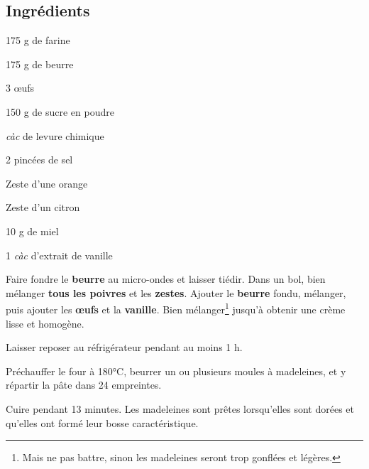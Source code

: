 \newpage
{}

\subsection*{Ingrédients}
\begin{ingredients}
	\item 175 g de farine
	\item 175 g de beurre
	\item 3 \oe ufs
	\item 150 g de sucre en poudre
	\item {} \textit{càc} de levure chimique
	\item 2 pincées de sel
	\item Zeste d'une orange
	\item Zeste d'un citron
	\item 10 g de miel
	\item 1 \textit{càc} d'extrait de vanille
\end{ingredients}

\medskip

Faire fondre le \textbf{beurre} au micro-ondes et laisser tiédir.
Dans un bol, bien mélanger \textbf{tous les poivres} et les \textbf{zestes}.
Ajouter le \textbf{beurre} fondu, mélanger, puis ajouter les \textbf{\oe ufs} et la \textbf{vanille}.
Bien mélanger\footnote{Mais ne pas battre, sinon les madeleines seront trop gonflées et légères.} jusqu'à obtenir une crème lisse et homogène.

Laisser reposer au réfrigérateur pendant au moins 1 h.

Préchauffer le four à 180°C, beurrer un ou plusieurs moules à madeleines, et y répartir la pâte dans 24 empreintes.

Cuire pendant 13 minutes.
Les madeleines sont prêtes lorsqu'elles sont dorées et qu'elles ont formé leur bosse caractéristique.


\vspace*{0.75 cm}

\begin{recipeblock}
	\noindent 
\end{recipeblock}